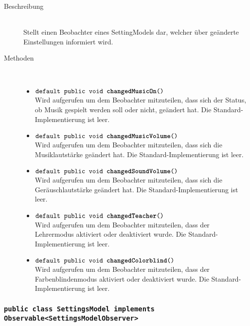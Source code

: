 \begin{description}
\item[Beschreibung] \hfill \\ Stellt einen Beobachter eines SettingModels dar, welcher über geänderte Einstellungen informiert wird.

\item[Methoden] \hfill \\
	\vspace{-.8cm}
	\begin{itemize}
		\item $\texttt{default public void \textbf{changedMusicOn}()}$ \\ Wird aufgerufen um dem Beobachter mitzuteilen, 
		dass sich der Status, ob Musik gespielt werden soll oder nicht, geändert hat. Die Standard-Implementierung ist leer.
		\item $\texttt{default public void \textbf{changedMusicVolume}()}$ \\ Wird aufgerufen um dem Beobachter mitzuteilen, 
		dass sich die Musiklautstärke geändert hat. Die Standard-Implementierung ist leer.
		\item $\texttt{default public void \textbf{changedSoundVolume}()}$ \\ Wird aufgerufen um dem Beobachter mitzuteilen, 
		dass sich die Geräuschlautstärke geändert hat. Die Standard-Implementierung ist leer.
		\item $\texttt{default public void \textbf{changedTeacher}()}$ \\ Wird aufgerufen um dem Beobachter mitzuteilen, 
		dass der Lehrermodus aktiviert oder deaktiviert wurde. Die Standard-Implementierung ist leer.
		\item $\texttt{default public void \textbf{changedColorblind}()}$ \\ Wird aufgerufen um dem Beobachter mitzuteilen, 
		dass der Farbenblindenmodus aktiviert oder deaktiviert wurde. Die Standard-Implementierung ist leer.
	\end{itemize}
\end{description}

\subsubsection{\normalfont \texttt{public class \textbf{SettingsModel} implements Observable<SettingsModelObserver>}}

